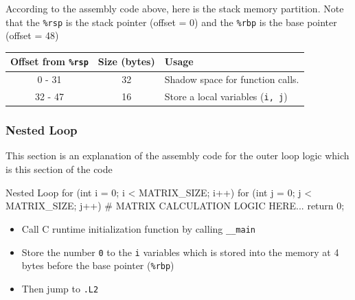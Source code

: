 \documentclass[12pt, a4paper]{article}
\begin{document}
                \noindent According to the assembly code above, here is the stack memory partition.
                Note that the \texttt{\%rsp} is the stack pointer (offset = 0)
                and the \texttt{\%rbp} is the base pointer (offset = 48)
                \begin{table}[h]
                    \centering
                    \begin{tabular}{|c|c|l|}
                        \hline
                        Offset from \texttt{\%rsp} & Size (bytes) & Usage \\
                        \hline \hline
                        0 - 31 & 32 & Shadow space for function calls. \\
                        32 - 47 & 16 & Store a local variables (\texttt{i, j}) \\
                        \hline
                    \end{tabular}
                \end{table}

    \pagebreak

            \subsubsection{Nested Loop}
                This section is an explanation of the assembly code for the outer loop logic which is this section of the code
                \begin{codeblock}[minted language=c]{Nested Loop}
                    for (int i = 0; i < MATRIX_SIZE; i++) {
                        for (int j = 0; j < MATRIX_SIZE; j++) {
                            # MATRIX CALCULATION LOGIC HERE...
                        }
                    }
                    return 0;
                \end{codeblock}

                \begin{itemize}
                    \item Call C runtime initialization function by calling \texttt{\_\_main}
                    \item Store the number \texttt{0} to the \texttt{i} variables which is stored into the
                    memory at 4 bytes before the base pointer (\texttt{\%rbp})
                    \item Then jump to \texttt{.L2}
                \end{itemize}
\end{document}
